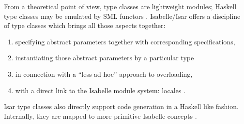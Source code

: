 \begin{isabellebody}
\begin{isamarkuptext}
  \noindent From a theoretical point of view, type classes are
  lightweight modules; Haskell type classes may be emulated by SML
  functors \cite{classes_modules}.  Isabelle/Isar offers a discipline
  of type classes which brings all those aspects together:

  \begin{enumerate}
    \item specifying abstract parameters together with
       corresponding specifications,
    \item instantiating those abstract parameters by a particular
       type
    \item in connection with a ``less ad-hoc'' approach to overloading,
    \item with a direct link to the Isabelle module system:
      locales \cite{kammueller-locales}.
  \end{enumerate}

  \noindent Isar type classes also directly support code generation in
  a Haskell like fashion. Internally, they are mapped to more
  primitive Isabelle concepts \cite{Haftmann-Wenzel:2006:classes}.


\end{isamarkuptext}
\end{isabellebody}
